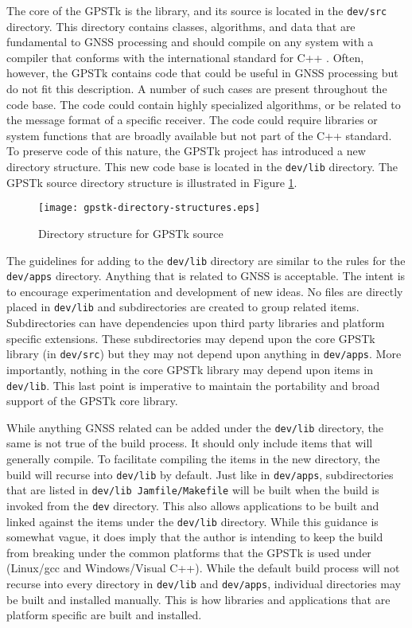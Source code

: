 \documentclass[letterpaper,ugly,10pt]{ion-gps}
\newcommand{\gpstkdir}[1]{\texttt{\mbox{#1}}}
\begin{document}
The core of the GPSTk is the library, and its source is located in the \gpstkdir{dev/src} directory. This directory contains classes, algorithms, and data that are fundamental to GNSS processing and should compile on any system with a compiler that conforms with the international standard for C++ \cite{iso-14882-2003}. Often, however, the GPSTk contains code that could be useful in GNSS processing but do not fit this description. A number of such cases are present throughout the code base. The code could contain highly specialized algorithms, or be related to the message format of a specific receiver. The code could require libraries or system functions that are broadly available but not part of the C++ standard. To preserve code of this nature, the GPSTk project has introduced a new directory structure. This new code base is located in the \gpstkdir{dev/lib} directory. The GPSTk source directory structure is illustrated in Figure \ref{fig:gpstkdevstructure}.
\begin{figure}
	\centering
	\texttt{[image: gpstk-directory-structures.eps]}
	\caption{Directory structure for GPSTk source}
	\label{fig:gpstkdevstructure}
\end{figure}

The guidelines for adding to the \gpstkdir{dev/lib} directory are similar to the rules for the \gpstkdir{dev/apps} directory. Anything that is related to GNSS is acceptable. The intent is to encourage experimentation and development of new ideas. No files are directly placed in \gpstkdir{dev/lib} and subdirectories are created to group related items. Subdirectories can have dependencies upon third party libraries and platform specific extensions. These subdirectories may depend upon the core GPSTk library (in \gpstkdir{dev/src}) but they may not depend upon anything in \gpstkdir{dev/apps}. More importantly, nothing in the core GPSTk library may depend upon items in \gpstkdir{dev/lib}. This last point is imperative to maintain the portability and broad support of the GPSTk core library.

While anything GNSS related can be added under the \gpstkdir{dev/lib} directory, the same is not true of the build process. It should only include items that will generally compile. To facilitate compiling the items in the new directory, the build will recurse into \gpstkdir{dev/lib} by default. Just like in \gpstkdir{dev/apps}, subdirectories that are listed in \gpstkdir{dev/lib Jamfile/Makefile} will be built when the build is invoked from the \gpstkdir{dev} directory. This also allows applications to be built and linked against the items under the \gpstkdir{dev/lib} directory.  While this guidance is somewhat vague, it does imply that the author is intending to keep the build from breaking under the common platforms that the GPSTk is used under (Linux/gcc and Windows/Visual C++). While the default build process will not recurse into every directory in \gpstkdir{dev/lib} and \gpstkdir{dev/apps}, individual directories may be built and installed manually. This is how libraries and applications that are platform specific are built and installed.
\end{document}
